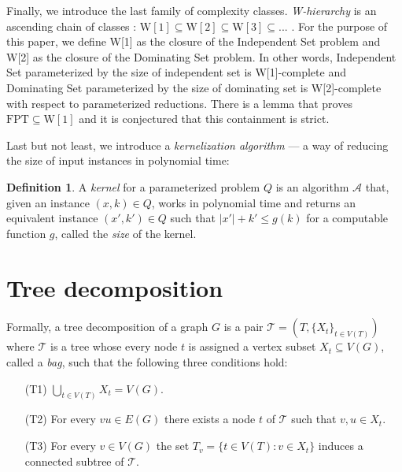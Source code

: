 \documentclass[en]{pracamgr}
\theoremstyle{definition}
\newtheorem{definition}{Definition}
\newcommand{\domsetp}{{\sc Dominating Set}}
\newcommand{\indset}{{\sc Independent Set}}
\newcommand{\w}[1]{\textrm{W}[#1]}
\begin{document}
Finally, we introduce the last family of complexity classes. \emph{W-hierarchy} is an ascending chain of classes : $\w{1} \subseteq \w{2} \subseteq \w{3} \subseteq...$ . For the purpose of this paper, we define \w{1} as the closure of the \indset{} problem and \w{2} as the closure of the \domsetp{} problem. In other words, \indset{} parameterized by the size of independent set is  \w{1}-complete and \domsetp{} parameterized by the size of dominating set is \w{2}-complete with respect to parameterized reductions. There is a lemma that proves $\textrm{FPT} \subseteq \w{1}$ and it is conjectured that this containment is strict.

Last but not least, we introduce a \emph{kernelization algorithm} --- a way of reducing the size of input instances in polynomial time:

\begin{definition}\label{Kernel}
	A \textit{kernel} for a parameterized problem $Q$ is an algorithm $\mathcal{A}$ that, given an instance $(x,k) \in Q$, works in polynomial time and returns an equivalent instance $(x',k') \in Q$
	such that $|x'| + k' \leq g(k)$ for a computable function $g$, called the \textit{size} of the kernel.
\end{definition}

\section{Tree decomposition}

Formally, a tree decomposition of a graph $G$ is a pair $\mathcal{T} = (T, \{X_t\}_{t\in V(T)})$ where $\mathcal{T}$ is a tree whose every node $t$ is assigned a vertex subset $X_t \subseteq V(G)$, called a \emph{bag}, such that the following three conditions hold:
\begin{itemize}
	\item[(T1)] $\bigcup_{t\in V(T)}X_t = V(G)$.
	\item[(T2)] For every $vu \in E(G)$ there exists a node $t$ of $\mathcal{T}$ such that $v,u \in X_t$.
	\item[(T3)] For every $v \in V(G)$ the set $T_v = \{t \in V(T): v \in X_t\}$ induces a connected subtree of $\mathcal{T}$.
\end{itemize}
\end{document}
